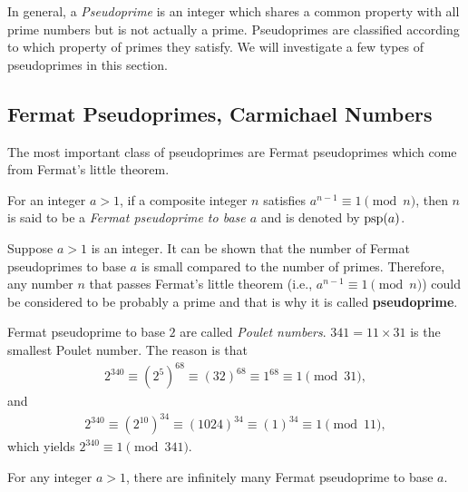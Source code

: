 \documentclass{subfile}
\begin{document}
In general, a \textit{Pseudoprime} is an integer which shares a common property with all prime numbers but is not actually a prime. Pseudoprimes are classified according to which property of primes they satisfy. We will investigate a few types of pseudoprimes in this section.

\subsection{Fermat Pseudoprimes,  Carmichael Numbers}
	The most important class of pseudoprimes are Fermat pseudoprimes which come from Fermat's little theorem.
		\begin{definition}
			For an integer $a>1$, if a composite integer $n$ satisfies $a^{n-1}\equiv 1\pmod n$, then $n$ is said to be a \textit{Fermat pseudoprime to base $a$} and is denoted by $\operatorname{psp}(a)$.
		\end{definition}
	Suppose $a>1$ is an integer. It can be shown that the number of Fermat pseudoprimes to base $a$ is small compared to the number of primes. Therefore, any number $n$ that passes Fermat's little theorem (i.e., $a^{n-1} \equiv 1 \pmod n$) could be considered to be probably a prime and that is why it is called \textbf{pseudoprime}.

		\begin{example}
			Fermat pseudoprime to base $2$ are called \textit{Poulet numbers}. $341=11\times 31$ is the smallest Poulet number. The reason is that
				\begin{align*}
					2^{340} \equiv \left(2^5\right)^{68} \equiv (32)^{68} \equiv 1^{68} \equiv 1 \pmod{31},
				\end{align*}
			and
				\begin{align*}
					2^{340} \equiv \left(2^{10}\right)^{34} \equiv (1024)^{34} \equiv (1)^{34} \equiv 1 \pmod{11},
				\end{align*}
			which yields $2^{340} \equiv 1 \pmod{341}$.
		\end{example}


		\begin{theorem}
			For any integer $a>1$, there are infinitely many Fermat pseudoprime to base $a$.
		\end{theorem}
\end{document}
